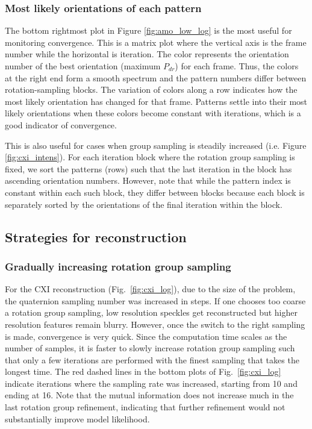 \documentclass[]{iucr}              %
\begin{document}
\subsubsection{Most likely orientations of each pattern}
The bottom rightmost plot in Figure \ref{fig:amo_low_log} is the most useful for monitoring convergence. This is a matrix plot where the vertical axis is the frame number while the horizontal is iteration. The color represents the orientation number of the best orientation (maximum $P_{dr}$) for each frame. Thus, the colors at the right end form a smooth spectrum and the pattern numbers differ between rotation-sampling blocks. The variation of colors along a row indicates how the most likely orientation has changed for that frame. Patterns settle into their most likely orientations when these colors become constant with iterations, which is a good indicator of convergence.

This is also useful for cases when group sampling is steadily increased (i.e. Figure \ref{fig:cxi_intens}). For each iteration block where the rotation group sampling is fixed, we sort the patterns (rows) such that the last iteration in the block has ascending orientation numbers. However, note that while the pattern index is constant within each such block, they differ between blocks because each block is separately sorted by the orientations of the final iteration within the block.

\subsection{Strategies for reconstruction} \label{subsec:strategy}

\subsubsection{Gradually increasing rotation group sampling} \label{subsec:quatRefine}
For the CXI reconstruction (Fig.~\ref{fig:cxi_log}), due to the size of the problem, the quaternion sampling number was increased in steps. If one chooses too coarse a rotation group sampling, low resolution speckles get reconstructed but higher resolution features remain blurry. However, once the switch to the right sampling is made, convergence is very quick. Since the computation time scales as the number of samples, it is faster to slowly increase rotation group sampling such that only a few iterations are performed with the finest sampling that takes the longest time. The red dashed lines in the bottom plots of Fig.~\ref{fig:cxi_log} indicate iterations where the sampling rate was increased, starting from 10 and ending at 16. Note that the mutual information does not increase much in the last rotation group refinement, indicating that further refinement would not substantially improve model likelihood.
\end{document}
